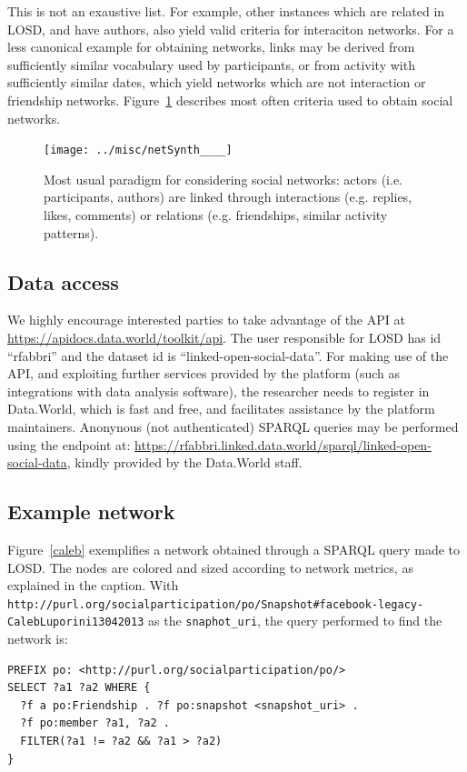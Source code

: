 \documentclass[data,datadescriptor,submit,moreauthors,pdftex]{Definitions/mdpi}
\newcommand{\te}[1] {\texttt{\footnotesize#1}}
\begin{document}
This is not an exaustive list.
For example, other instances which are related in LOSD, and have authors,
also yield valid criteria for interaciton networks.
For a less canonical example for obtaining networks, links may be derived from sufficiently similar vocabulary used by participants, or from activity with sufficiently similar dates, which yield networks which are not interaction or friendship networks.
Figure~\ref{fnet} describes most often criteria used to obtain social networks.

\begin{figure}[H]
    \centering
    \texttt{[image: ../misc/netSynth\_\_\_\_]}
    \caption{Most usual paradigm for considering social networks:
    actors (i.e. participants, authors) are linked through interactions
    (e.g. replies, likes, comments)
    or relations (e.g. friendships, similar activity patterns).}\label{fnet}
\end{figure}

\subsection{Data access}\label{sac}
We highly encourage interested parties to take advantage of the API at \url{https://apidocs.data.world/toolkit/api}.
The user responsible for LOSD has id ``rfabbri'' and the dataset id is ``linked-open-social-data''.
For making use of the API, and exploiting further services provided by the platform (such as integrations with data analysis software), the researcher needs to register in Data.World, which is fast and free, and facilitates assistance by the platform maintainers.
Anonynous (not authenticated) SPARQL queries may be performed using the endpoint at: \url{https://rfabbri.linked.data.world/sparql/linked-open-social-data}, kindly provided by the Data.World staff.

\subsection{Example network}\label{sex}
Figure~\ref{caleb} exemplifies a network obtained through a SPARQL query made to LOSD. The nodes are colored and sized according to network metrics, as explained in the caption. With \te{http://purl.org/socialparticipation/po/Snapshot\#facebook-legacy-CalebLuporini13042013} as the \te{snaphot\_uri}, the query performed to find the network is:
\begin{lstlisting}[language=spq]
PREFIX po: <http://purl.org/socialparticipation/po/>
SELECT ?a1 ?a2 WHERE {
  ?f a po:Friendship . ?f po:snapshot <snapshot_uri> .
  ?f po:member ?a1, ?a2 .
  FILTER(?a1 != ?a2 && ?a1 > ?a2)
}
\end{lstlisting}
\end{document}
